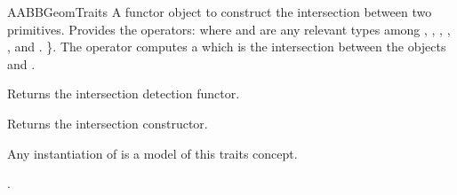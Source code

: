 \begin{ccRefConcept}{AABBGeomTraits}
{A functor object to construct the intersection between two primitives.
Provides the operators:
where  and  are any relevant types
among , , ,  , ,  and . \}.
The operator computes a  which is the intersection between the objects  and .}

\ccCreation
{}  %


\ccOperations

{Returns the intersection detection functor.}

{Returns the intersection constructor.}

\ccHasModels
Any instantiation of  is a model of this traits concept.

\ccSeeAlso

.


\end{ccRefConcept}

\ccRefPageEnd


